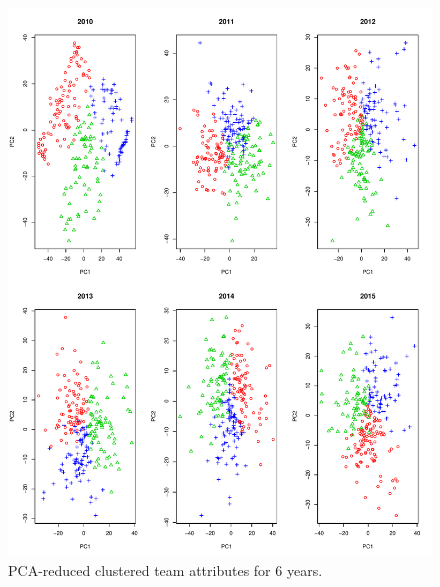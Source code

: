 \documentclass[11pt]{article}
\begin{document}
\begin{figure}[ht]
  \centering
  \includegraphics[scale=0.6]{clusters}
  \caption{PCA-reduced clustered team attributes for 6 years.}
  \label{fig:clusters}
\end{figure}
\end{document}
